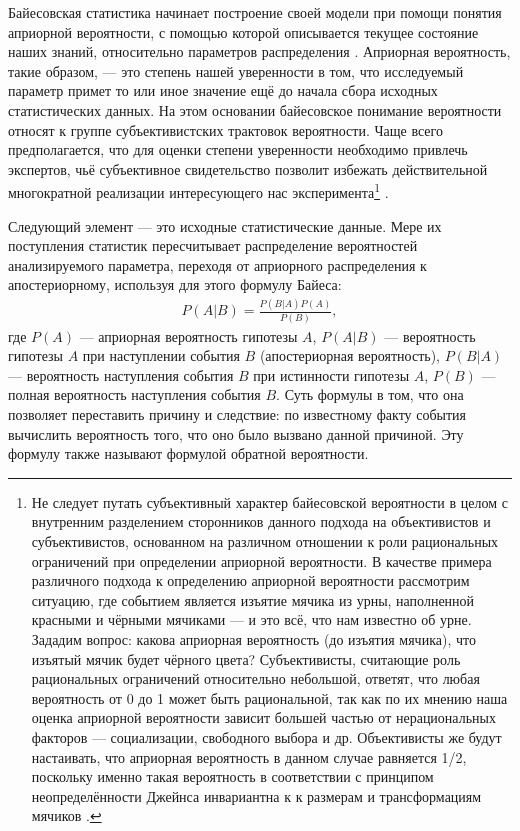 Байесовская статистика начинает построение своей модели при помощи понятия априорной вероятности, с помощью которой описывается текущее состояние наших знаний, относительно параметров распределения \cite[стр. 18]{Gaul2012}. Априорная вероятность, такие образом, --- это степень нашей уверенности в том, что исследуемый параметр примет то или иное значение ещё до начала сбора исходных статистических данных. На этом основании байесовское понимание вероятности относят к группе субъективистских трактовок вероятности. Чаще всего предполагается, что для оценки степени уверенности необходимо привлечь экспертов, чьё субъективное свидетельство позволит избежать действительной многократной реализации интересующего нас эксперимента\footnote{Не следует путать субъективный характер байесовской вероятности в целом с внутренним разделением сторонников данного подхода на объективистов и субъективистов, основанном на различном отношении к роли рациональных ограничений при определении априорной вероятности. В качестве примера различного подхода к определению априорной вероятности рассмотрим ситуацию, где событием является изъятие мячика из урны, наполненной красными и чёрными мячиками --- и это всё, что нам известно об урне. Зададим вопрос: какова априорная вероятность (до изъятия мячика), что изъятый мячик будет чёрного цвета? Субъективисты, считающие роль рациональных ограничений относительно небольшой, ответят, что любая вероятность от 0 до 1 может быть рациональной, так как по их мнению наша оценка априорной вероятности зависит большей частью от нерациональных факторов --- социализации, свободного выбора и др. Объективисты же будут настаивать, что априорная вероятность в данном случае равняется 1/2, поскольку именно такая вероятность в соответствии с принципом неопределённости Джейнса инвариантна к к размерам и трансформациям мячиков \cite{Talbott2013}.} \cite[стр. 34]{Aivazyan2001}.

Следующий элемент --- это исходные статистические данные. Мере их поступления статистик пересчитывает распределение вероятностей анализируемого параметра, переходя от априорного распределения к апостериорному, используя для этого формулу Байеса:
\begin{eqnarray}
P(A|B)=\frac{P(B|A)P(A)}{P(B)},
\end{eqnarray} где $P(A)$ --- априорная вероятность гипотезы $A$, $P(A|B)$ --- вероятность гипотезы $A$ при наступлении события $B$ (апостериорная вероятность), $P(B|A)$ --- вероятность наступления события $B$ при истинности гипотезы $A$, $P(B)$ --- полная вероятность наступления события $B$. Суть формулы в том, что она позволяет переставить причину и следствие: по известному факту события вычислить вероятность того, что оно было вызвано данной причиной. Эту формулу также называют формулой обратной вероятности. 

